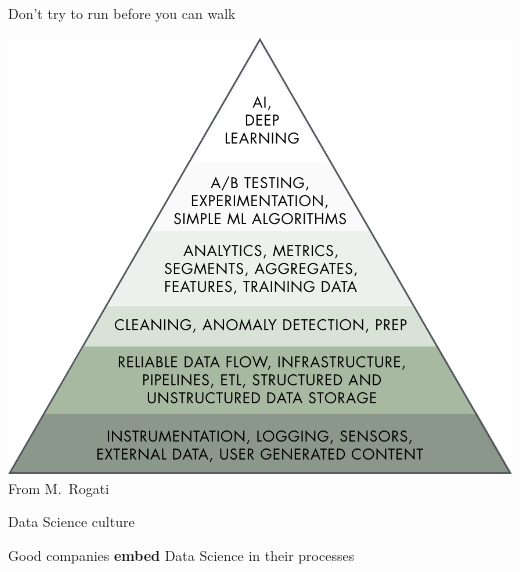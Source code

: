 \begin{frame}{Don't try to run before you can walk}
    \begin{center}
        \includegraphics[height=0.8\textheight]{figures/ai_hierarchy} \\
        {\scriptsize%
         From M.\ Rogati}
    \end{center}
\end{frame}

\begin{frame}{Data Science culture}
    \begin{center}
        \large%
        Good companies \textbf{embed} Data Science in their processes
    \end{center}
    \vfill
\end{frame}

